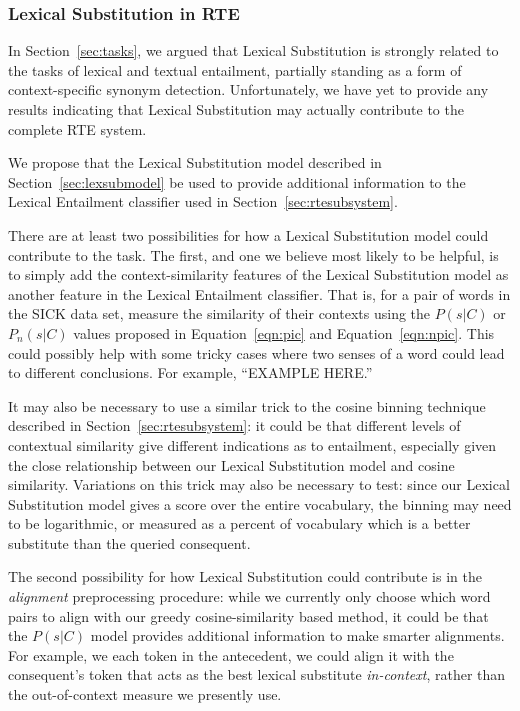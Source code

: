 \documentclass[letterpaper]{article}
\begin{document}
\subsubsection{Lexical Substitution in RTE}

In Section~\ref{sec:tasks}, we argued that Lexical Substitution is strongly
related to the tasks of lexical and textual entailment, partially standing
as a form of context-specific synonym detection. Unfortunately, we have
yet to provide any results indicating that Lexical Substitution may actually
contribute to the complete RTE system.

We propose that the Lexical Substitution model described in
Section~\ref{sec:lexsubmodel} be used to provide additional information to
the Lexical Entailment classifier used in Section~\ref{sec:rtesubsystem}.

There are at least two possibilities for how a Lexical Substitution model could
contribute to the task. The first, and one we believe most likely to be
helpful, is to simply add the context-similarity features of the Lexical
Substitution model as another feature in the Lexical Entailment classifier.
That is, for a pair of words in the SICK data set, measure the similarity of
their contexts using the $P(s|C)$ or $P_n(s|C)$ values proposed in
Equation~\ref{eqn:pic} and Equation~\ref{eqn:npic}. This could possibly help
with some tricky cases where two senses of a word could lead to different conclusions.
For example, ``EXAMPLE HERE.''

It may also be necessary to use a similar trick to the cosine binning technique
described in Section~\ref{sec:rtesubsystem}: it could be that different levels
of contextual similarity give different indications as to entailment, especially
given the close relationship between our Lexical Substitution model and
cosine similarity. Variations on this trick may also be necessary to test:
since our Lexical Substitution model gives a score over the entire vocabulary,
the binning may need to be logarithmic, or measured as a percent of vocabulary
which is a better substitute than the queried consequent.

The second possibility for how Lexical Substitution could contribute is in
the {\em alignment} preprocessing procedure: while we currently only choose
which word pairs to align with our greedy cosine-similarity based method, it
could be that the $P(s|C)$ model provides additional information to make
smarter alignments. For example, we each token in the antecedent, we could
align it with the consequent's token that acts as the best lexical substitute
{\em in-context}, rather than the out-of-context measure we presently use.
\end{document}
